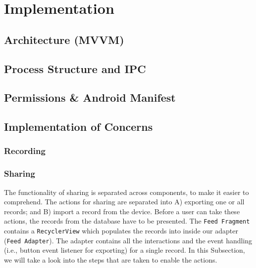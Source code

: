 \chapter{Implementation}

\section{Architecture (MVVM)}
\section{Process Structure and IPC}
\section{Permissions \& Android Manifest}

\section{Implementation of Concerns}

\subsection{Recording}





\subsection{Sharing}

The functionality of sharing is separated across components, to make it easier to comprehend. The actions for sharing are separated into A) exporting one or all records; and B) import a record from the device. Before a user can take these actions, the records from the database have to be presented. The \verb|Feed Fragment| contains a \verb|RecyclerView| which populates the records into inside our adapter (\verb|Feed Adapter|). The adapter contains all the interactions and the event handling (i.e., button event listener for exporting) for a single record. In this Subsection, we will take a look into the steps that are taken to enable the actions.

